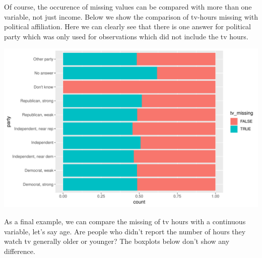 \documentclass[]{tufte-book}
\newenvironment{Shaded}{}{}
\newcommand{\KeywordTok}[1]{\textcolor[rgb]{0.00,0.44,0.13}{\textbf{#1}}}
\newcommand{\DataTypeTok}[1]{\textcolor[rgb]{0.56,0.13,0.00}{#1}}
\newcommand{\StringTok}[1]{\textcolor[rgb]{0.25,0.44,0.63}{#1}}
\newcommand{\OperatorTok}[1]{\textcolor[rgb]{0.40,0.40,0.40}{#1}}
\newcommand{\NormalTok}[1]{#1}
\begin{document}
Of course, the occurence of missing values can be compared with more
than one variable, not just income. Below we show the comparison of
tv-hours missing with political affiliation. Here we can clearly see
that there is one answer for political party which was only used for
observations which did not include the tv hours.

\begin{Shaded}
\end{Shaded}

\includegraphics{cleaning_tutorial_files/figure-latex/unnamed-chunk-48-1}

As a final example, we can compare the missing of tv hours with a
continuous variable, let's say age. Are people who didn't report the
number of hours they watch tv generally older or younger? The boxplots
below don't show any difference.

\begin{Shaded}
\end{Shaded}
\end{document}
